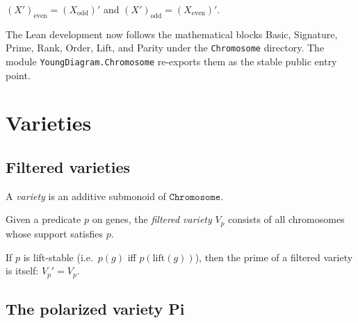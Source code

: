 \begin{lemma}
  \label{lem:parity_prime}
  \leanok
  $(X')_{\mathrm{even}} = (X_{\mathrm{odd}})'$ and $(X')_{\mathrm{odd}} = (X_{\mathrm{even}})'$.
\end{lemma}

\begin{remark}
  The Lean development now follows the mathematical blocks Basic, Signature,
  Prime, Rank, Order, Lift, and Parity under the \texttt{Chromosome}
  directory.  The module \texttt{YoungDiagram.Chromosome} re-exports them as
  the stable public entry point.
\end{remark}


\chapter{Varieties}

\section{Filtered varieties}

\begin{definition}[Variety]
  \label{def:Variety}
  \leanok
  A \emph{variety} is an additive submonoid of $\mathtt{Chromosome}$.
\end{definition}

\begin{definition}
  \label{def:varietyOfFilter}
  \leanok
  Given a predicate $p$ on genes, the \emph{filtered variety} $V_p$ consists of
  all chromosomes whose support satisfies $p$.
\end{definition}

\begin{lemma}
  \label{lem:prime_varietyOfFilter}
  \leanok
  If $p$ is lift-stable (i.e.\ $p(g)$ iff $p(\mathrm{lift}(g))$), then the prime
  of a filtered variety is itself: $V_p' = V_p$.
\end{lemma}

\section{The polarized variety Pi}

